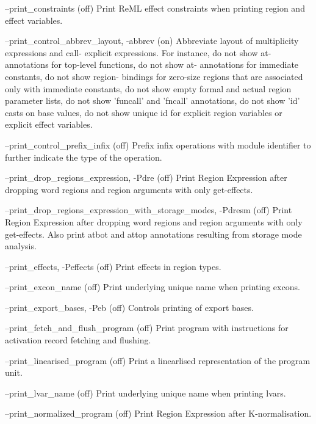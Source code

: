 \documentclass[12pt]{book}
\begin{document}
\begin{scriptcode}
--print_constraints                                      (off)
     Print ReML effect constraints when printing region and
     effect variables.

--print_control_abbrev_layout, -abbrev                    (on)
     Abbreviate layout of multiplicity expressions and call-
     explicit expressions. For instance, do not show at-
     annotations for top-level functions, do not show at-
     annotations for immediate constants, do not show region-
     bindings for zero-size regions that are associated only
     with immediate constants, do not show empty formal and
     actual region parameter lists, do not show 'funcall' and
     'fncall' annotations, do not show 'id' casts on base values,
     do not show unique id for explicit region variables or
     explicit effect variables.

--print_control_prefix_infix                             (off)
     Prefix infix operations with module identifier to further
     indicate the type of the operation.

--print_drop_regions_expression, -Pdre                   (off)
     Print Region Expression after dropping word regions and
     region arguments with only get-effects.

--print_drop_regions_expression_with_storage_modes, -Pdresm (off)
     Print Region Expression after dropping word regions and
     region arguments with only get-effects. Also print
     atbot and attop annotations resulting from storage mode
     analysis.

--print_effects, -Peffects                               (off)
     Print effects in region types.

--print_excon_name                                       (off)
     Print underlying unique name when printing excons.

--print_export_bases, -Peb                               (off)
     Controls printing of export bases.

--print_fetch_and_flush_program                          (off)
     Print program with instructions for activation
     record fetching and flushing.

--print_linearised_program                               (off)
     Print a linearlised representation of the
     program unit.

--print_lvar_name                                        (off)
     Print underlying unique name when printing lvars.

--print_normalized_program                               (off)
     Print Region Expression after K-normalisation.


\end{scriptcode}
\end{document}
